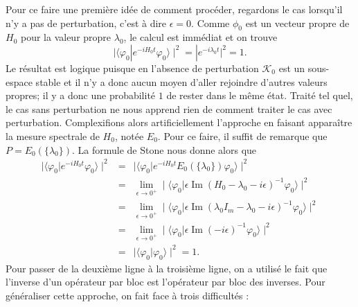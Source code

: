 \documentclass[12pt,openany,a4paper, titlepage]{article}
\newcommand{\lp}{\left(}
\newcommand{\rp}{\right)}
\newcommand{\KK}{\mathcal{K}}
\newcommand{\vp}{\varphi}
\newcommand{\inv}{^{-1}}
\newcommand{\im}{\operatorname{Im}}
\newcommand{\limeo}{\lim\limits_{\epsilon \rightarrow 0^+}}
\theoremstyle{definition}
\theoremstyle{definition}
\theoremstyle{definition}
\theoremstyle{definition}
\theoremstyle{definition}
\theoremstyle{definition}
\begin{document}
Pour ce faire une première idée de comment procéder, regardons le cas lorsqu'il n'y a pas de perturbation, c'est à dire $\epsilon = 0$. Comme $\phi_0$ est un vecteur propre de $H_0$ pour la valeur propre $\lambda_0$, le calcul est immédiat et on trouve 
\begin{equation}
    \mid \langle \vp_0 | e^{-iH_0t} \vp_0 \rangle\mid^2 = |e^{-i\lambda_0t}|^2 = 1.
\end{equation}
Le résultat est logique puisque en l'absence de perturbation $\KK_0$ est un sous-espace stable et il n'y a donc aucun moyen d'aller rejoindre d'autres valeurs propres; il y a donc une probabilité $1$ de rester dans le même état. Traité tel quel, le cas sans perturbation ne nous apprend rien de comment traiter le cas avec perturbation. Complexifions alors artificiellement l'approche en faisant apparaître la mesure spectrale de $H_0$, notée $E_0$. Pour ce faire, il suffit de remarque que $P = E_0(\{\lambda_0\})$. La formule de Stone nous donne alors que 
\begin{eqnarray*}
    \mid \langle \vp_0 | e^{-iH_0t} \vp_0 \rangle\mid^2 &=&\mid \langle \vp_0 | e^{-iH_0t}E_0(\{\lambda_0\}) \vp_0 \rangle\mid^2
    \\ &=& \limeo \mid \langle \vp_0 | \epsilon\im\lp H_0 - \lambda_0 - i\epsilon\rp\inv \vp_0 \rangle\mid^2 \\
    &=& \limeo \mid \langle \vp_0 | \epsilon\im\lp \lambda_0 I_m - \lambda_0 - i\epsilon\rp\inv \vp_0 \rangle\mid^2 \\
    &=&  \limeo \mid \langle \vp_0 | \epsilon\im\lp - i\epsilon\rp\inv \vp_0 \rangle\mid^2\\
    &=&  \mid \langle \vp_0 | \vp_0 \rangle\mid^2 = 1.
\end{eqnarray*}
Pour passer de la deuxième ligne à la troisième ligne, on a utilisé le fait que l'inverse d'un opérateur par bloc est l'opérateur par bloc des inverses. 
Pour généraliser cette approche, on fait face à trois difficultés :
\end{document}
